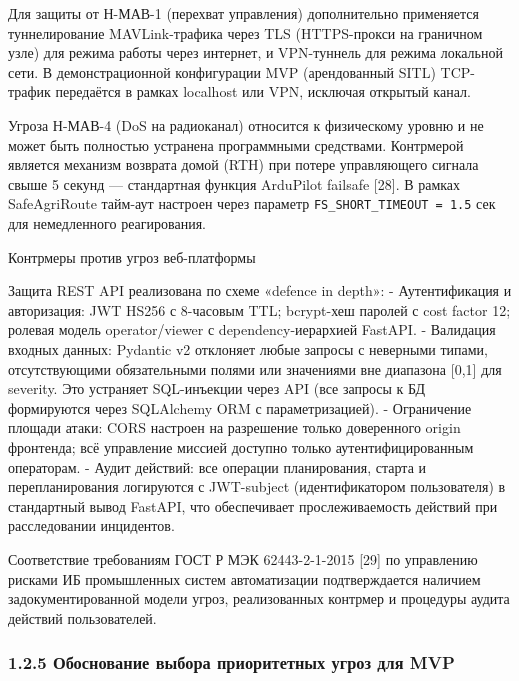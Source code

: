 \documentclass[14pt,a4paper]{extarticle}
\begin{document}
Для защиты от Н-МАВ-1 (перехват управления) дополнительно применяется туннелирование MAVLink-трафика через TLS (HTTPS-прокси на граничном узле) для режима работы через интернет, и VPN-туннель для режима локальной сети. В демонстрационной конфигурации MVP (арендованный SITL) TCP-трафик передаётся в рамках localhost или VPN, исключая открытый канал.

Угроза Н-МАВ-4 (DoS на радиоканал) относится к физическому уровню и не может быть полностью устранена программными средствами. Контрмерой является механизм возврата домой (RTH) при потере управляющего сигнала свыше 5 секунд --- стандартная функция ArduPilot failsafe {[}28{]}. В рамках SafeAgriRoute тайм-аут настроен через параметр \texttt{FS\_SHORT\_TIMEOUT\ =\ 1.5} сек для немедленного реагирования.

Контрмеры против угроз веб-платформы

Защита REST API реализована по схеме «defence in depth»: - Аутентификация и авторизация: JWT HS256 с 8-часовым TTL; bcrypt-хеш паролей с cost factor 12; ролевая модель operator/viewer с dependency-иерархией FastAPI. - Валидация входных данных: Pydantic v2 отклоняет любые запросы с неверными типами, отсутствующими обязательными полями или значениями вне диапазона {[}0,1{]} для severity. Это устраняет SQL-инъекции через API (все запросы к БД формируются через SQLAlchemy ORM с параметризацией). - Ограничение площади атаки: CORS настроен на разрешение только доверенного origin фронтенда; всё управление миссией доступно только аутентифицированным операторам. - Аудит действий: все операции планирования, старта и перепланирования логируются с JWT-subject (идентификатором пользователя) в стандартный вывод FastAPI, что обеспечивает прослеживаемость действий при расследовании инцидентов.

Соответствие требованиям ГОСТ Р МЭК 62443-2-1-2015 {[}29{]} по управлению рисками ИБ промышленных систем автоматизации подтверждается наличием задокументированной модели угроз, реализованных контрмер и процедуры аудита действий пользователей.

\hypertarget{ux43eux431ux43eux441ux43dux43eux432ux430ux43dux438ux435-ux432ux44bux431ux43eux440ux430-ux43fux440ux438ux43eux440ux438ux442ux435ux442ux43dux44bux445-ux443ux433ux440ux43eux437-ux434ux43bux44f-mvp}{%
\subsubsection{1.2.5 Обоснование выбора приоритетных угроз для MVP}\label{ux43eux431ux43eux441ux43dux43eux432ux430ux43dux438ux435-ux432ux44bux431ux43eux440ux430-ux43fux440ux438ux43eux440ux438ux442ux435ux442ux43dux44bux445-ux443ux433ux440ux43eux437-ux434ux43bux44f-mvp}}
\end{document}
